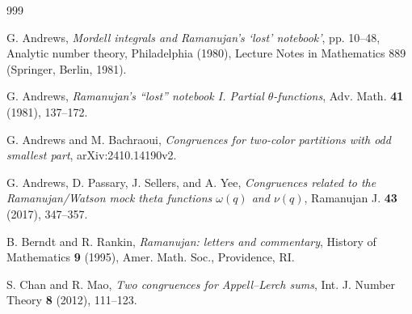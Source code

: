\documentclass[12pt,reqno]{amsart}
\renewcommand{\o}{{\omega}}
\renewcommand{\(}{\left\(}
\renewcommand{\)}{\right\)}
\numberwithin{equation}{section}
\theoremstyle{plain}
\theoremstyle{definition}
\numberwithin{equation}{section}
\begin{document}
\begin{thebibliography}{999}
	
	G. Andrews, {\it Mordell integrals and Ramanujan’s ‘lost’ notebook’}, pp. 10–48, Analytic number theory, Philadelphia (1980), Lecture Notes in Mathematics 889 (Springer, Berlin, 1981).

	 G. Andrews, {\it Ramanujan's ``lost'' notebook I. Partial $\theta$-functions}, Adv. Math. {\bf 41} (1981), 137--172.
	
	
	
	
 G. Andrews and M. Bachraoui, {\it Congruences for two-color partitions with odd smallest part},  arXiv:2410.14190v2.


 G. Andrews, D. Passary, J. Sellers, and A. Yee, {\it Congruences related to the Ramanujan/Watson mock theta functions $\o(q)$ and $\nu(q)$}, Ramanujan J. {\bf 43} (2017), 347--357.


	 B. Berndt and R. Rankin, {\it Ramanujan: letters and commentary}, History of Mathematics {\bf 9} (1995), Amer. Math. Soc., Providence, RI.


 S. Chan and R. Mao, {\it Two congruences for Appell--Lerch sums}, Int. J. Number Theory {\bf 8} (2012), 111--123.






\end{thebibliography}
\end{document}
